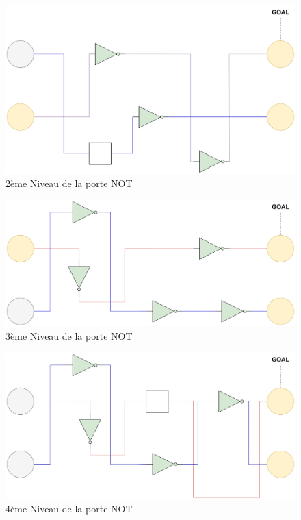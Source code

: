 \documentclass{article}
\begin{document}
\begin{figure}[h]
    \centering
    \includegraphics[width=\textwidth]{img/Levels-NOT-2.jpg}
    \caption{2ème Niveau de la porte NOT}
\end{figure}
\begin{figure}[h]
    \centering
    \includegraphics[width=\textwidth]{img/Levels-NOT-3.jpg}
    \caption{3ème Niveau de la porte NOT}
\end{figure}
\begin{figure}[h]
    \centering
    \includegraphics[width=\textwidth]{img/Levels-NOT-4.jpg}
    \caption{4ème Niveau de la porte NOT}
\end{figure}
\end{document}
